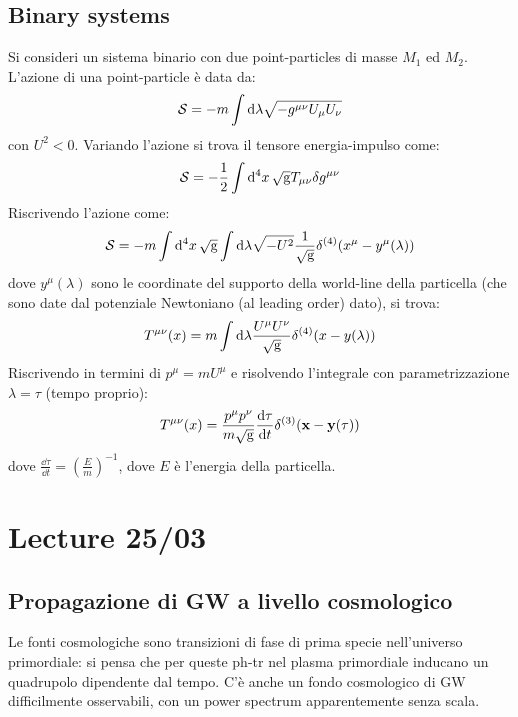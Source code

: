 \section{Binary systems}

Si consideri un sistema binario con due point-particles di masse $ M_1 $ ed $ M_2 $. L'azione di una point-particle è data da:
\begin{equation*}
  \mathcal{S} = - m \int \mathrm{d} \lambda \sqrt{- g^{\mu \nu} U_\mu U_\nu}
\end{equation*}
con $ U^2 < 0 $. Variando l'azione si trova il tensore energia-impulso come:
\begin{equation*}
  \mathcal{S} = - \frac{1}{2} \int \mathrm{d}^4x \,\sqrt{\mathrm{g}} T_{\mu \nu} \delta g^{\mu \nu}
\end{equation*}
Riscrivendo l'azione come:
\begin{equation*}
  \mathcal{S} = - m \int \mathrm{d}^4x \,\sqrt{\mathrm{g}} \int \mathrm{d} \lambda \sqrt{-U^2} \frac{1}{\sqrt{\mathrm{g}}} \delta^{(4)}(x^\mu - y^\mu(\lambda))
\end{equation*}
dove $ y^\mu(\lambda) $ sono le coordinate del supporto della world-line della particella (che sono date dal potenziale Newtoniano (al leading order) dato), si trova:
\begin{equation*}
  T^{\mu \nu}(x) = m \int \mathrm{d} \lambda \frac{U^\mu U^\nu}{\sqrt{\mathrm{g}}} \delta^{(4)}(x - y(\lambda))
\end{equation*}
Riscrivendo in termini di $ p^\mu = m U^\mu $ e risolvendo l'integrale con parametrizzazione $ \lambda = \tau $ (tempo proprio):
\begin{equation}
  T^{\mu \nu}(x) = \frac{p^\mu p^\nu}{m \sqrt{\mathrm{g}}} \frac{\mathrm{d} \tau}{\mathrm{d} t} \delta^{(3)}(\mathbf{x} - \mathbf{y}(\tau))
\end{equation}
dove $ \frac{\dd \tau}{\dd t} = \left( \frac{E}{m} \right)^{-1} $, dove $ E $ è l'energia della particella.

\chapter{Lecture 25/03}

\section{Propagazione di GW a livello cosmologico}

Le fonti cosmologiche sono transizioni di fase di prima specie nell'universo primordiale: si pensa che per queste ph-tr nel plasma primordiale inducano un quadrupolo dipendente dal tempo. C'è anche un fondo cosmologico di GW difficilmente osservabili, con un power spectrum apparentemente senza scala.

